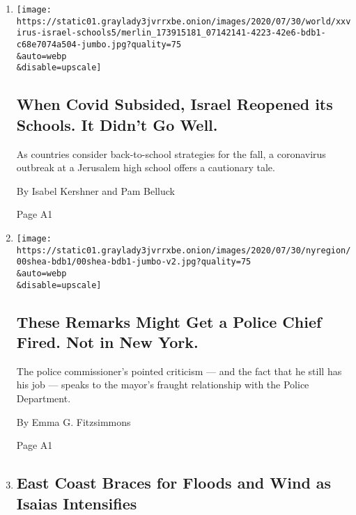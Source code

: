 \begin{enumerate}
\def\labelenumi{\arabic{enumi}.}
\item
  \href{/2020/08/04/world/middleeast/coronavirus-israel-schools-reopen.html}{}

  \texttt{[image: https://static01.graylady3jvrrxbe.onion/images/2020/07/30/world/xxvirus-israel-schools5/merlin\_173915181\_07142141-4223-42e6-bdb1-c68e7074a504-jumbo.jpg?quality=75\\\&auto=webp\\\&disable=upscale]}

  \hypertarget{when-covid-subsided-israel-reopened-its-schools-it-didnt-go-well}{%
  \subsection{When Covid Subsided, Israel Reopened its Schools. It
  Didn't Go
  Well.}\label{when-covid-subsided-israel-reopened-its-schools-it-didnt-go-well}}

  As countries consider back-to-school strategies for the fall, a
  coronavirus outbreak at a Jerusalem high school offers a cautionary
  tale.

  By Isabel Kershner and Pam Belluck

  Page A1
\item
  \href{/2020/08/03/nyregion/police-shea-de-blasio-nyc.html}{}

  \texttt{[image: https://static01.graylady3jvrrxbe.onion/images/2020/07/30/nyregion/00shea-bdb1/00shea-bdb1-jumbo-v2.jpg?quality=75\\\&auto=webp\\\&disable=upscale]}

  \hypertarget{these-remarks-might-get-a-police-chief-fired-not-in-new-york}{%
  \subsection{These Remarks Might Get a Police Chief Fired. Not in New
  York.}\label{these-remarks-might-get-a-police-chief-fired-not-in-new-york}}

  The police commissioner's pointed criticism --- and the fact that he
  still has his job --- speaks to the mayor's fraught relationship with
  the Police Department.

  By Emma G. Fitzsimmons

  Page A1
\item
  \href{/2020/08/03/us/isaias-east-coast-landfall.html}{}

  \hypertarget{east-coast-braces-for-floods-and-wind-as-isaias-intensifies}{%
  \subsection{East Coast Braces for Floods and Wind as Isaias
  Intensifies}\label{east-coast-braces-for-floods-and-wind-as-isaias-intensifies}}


\end{enumerate}
